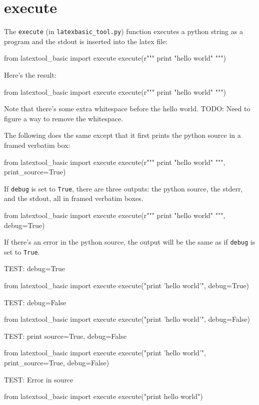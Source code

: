 \section{execute}
The \verb!execute! (in \verb!latexbasic_tool.py!) 
function executes a python string as a program
and the stdout is inserted into the latex file:
\begin{console}
\begin{python}
from latextool_basic import execute
execute(r"""
print "hello world"
""")
\end{python}
\end{console}
Here's the result:
\begin{python}
from latextool_basic import execute
execute(r"""
print "hello world"
""")
\end{python}

Note that there's some extra whitespace before the hello world.
TODO: Need to figure a way to remove the whitespace.

The following does the same except that it first prints
the python source in a framed verbatim box:
\begin{console}
\begin{python}
from latextool_basic import execute
execute(r"""
print "hello world"
""", print_source=True)
\end{python}
\end{console}

If \verb!debug! is set to \verb!True!, there are three
outputs: the python source, the stderr, and the stdout, all
in framed verbatim boxes.
\begin{console}
\begin{python}
from latextool_basic import execute
execute(r"""
print "hello world"
""", debug=True)
\end{python}
\end{console}
If there's an error in the python source, the output will be the same as if
\verb!debug! is set to \verb!True!.


TEST: debug=True
\begin{python}
from latextool_basic import execute
execute("print 'hello world'", debug=True)
\end{python}


TEST: debug=False

\begin{python}
from latextool_basic import execute
execute("print 'hello world'", debug=False)
\end{python}

TEST: print source=True, debug=False
\begin{python}
from latextool_basic import execute
execute("print 'hello world'", print_source=True, debug=False)
\end{python}

TEST: Error in source
\begin{python}
from latextool_basic import execute
execute("print hello world")
\end{python}
